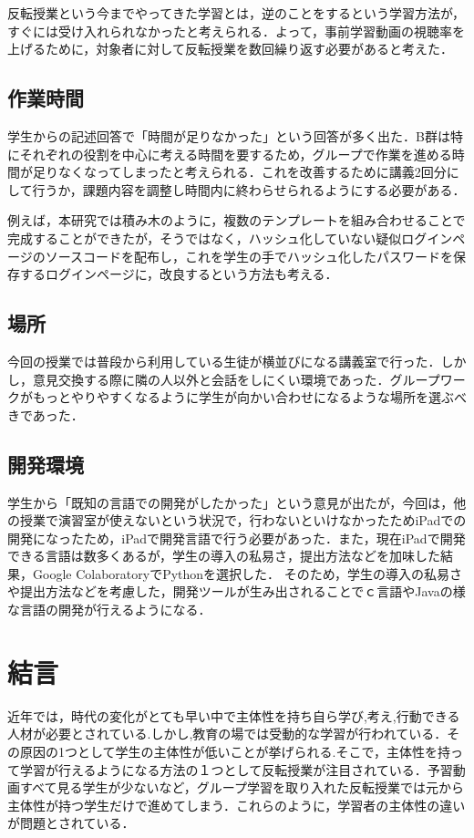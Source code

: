 \documentclass[a4j,11pt]{jsarticle}
\begin{document}
反転授業という今までやってきた学習とは，逆のことをするという学習方法が，すぐには受け入れられなかったと考えられる．よって，事前学習動画の視聴率を上げるために，対象者に対して反転授業を数回繰り返す必要があると考えた．
\subsection{作業時間}
学生からの記述回答で「時間が足りなかった」という回答が多く出た．B群は特にそれぞれの役割を中心に考える時間を要するため，グループで作業を進める時間が足りなくなってしまったと考えられる．これを改善するために講義2回分にして行うか，課題内容を調整し時間内に終わらせられるようにする必要がある．

例えば，本研究では積み木のように，複数のテンプレートを組み合わせることで完成することができたが，そうではなく，ハッシュ化していない疑似ログインページのソースコードを配布し，これを学生の手でハッシュ化したパスワードを保存するログインページに，改良するという方法も考える．

\subsection{場所}
今回の授業では普段から利用している生徒が横並びになる講義室で行った．しかし，意見交換する際に隣の人以外と会話をしにくい環境であった．グループワークがもっとやりやすくなるように学生が向かい合わせになるような場所を選ぶべきであった．

\subsection{開発環境}
学生から「既知の言語での開発がしたかった」という意見が出たが，今回は，他の授業で演習室が使えないという状況で，行わないといけなかったためiPadでの開発になったため，iPadで開発言語で行う必要があった．また，現在iPadで開発できる言語は数多くあるが，学生の導入の私易さ，提出方法などを加味した結果，Google ColaboratoryでPythonを選択した．
そのため，学生の導入の私易さや提出方法などを考慮した，開発ツールが生み出されることでｃ言語やJavaの様な言語の開発が行えるようになる．



\newpage
\section{結言}
近年では，時代の変化がとても早い中で主体性を持ち自ら学び,考え,行動できる人材が必要とされている.しかし,教育の場では受動的な学習が行われている．その原因の1つとして学生の主体性が低いことが挙げられる.そこで，主体性を持って学習が行えるようになる方法の１つとして反転授業が注目されている．予習動画すべて見る学生が少ないなど，グループ学習を取り入れた反転授業では元から主体性が持つ学生だけで進めてしまう．これらのように，学習者の主体性の違いが問題とされている．
\end{document}
